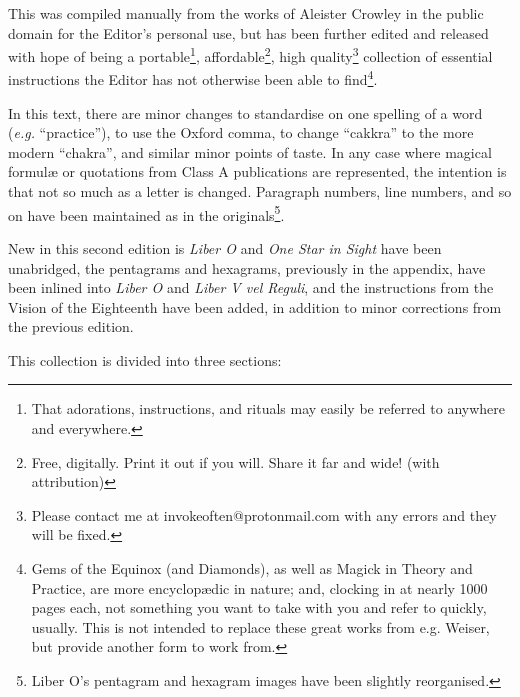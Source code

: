 This was compiled manually from the works of Aleister Crowley in the public domain for the Editor's personal use, but has been further edited and released with hope of being a portable\footnote{That adorations, instructions, and rituals may easily be referred to anywhere and everywhere.}, affordable\footnote{Free\footnotemark, digitally. Print it out if you will. Share it far and wide! (with attribution)}, high quality\footnote{Please contact me at invokeoften@protonmail.com with any errors and they will be fixed.\footnotemark} collection of essential instructions the Editor has not otherwise been able to find\footnote{Gems of the Equinox (and Diamonds), as well as Magick in Theory and Practice, are more encyclop\ae{}dic in nature; and, clocking in at nearly 1000 pages each, not something you want to take with you and refer to quickly, usually. This is not intended to replace these great works from e.g. Weiser, but provide another form to work from.}.

In this text, there are minor changes to standardise on one spelling of a word (\textit{e.g.} \enquote{practice}), to use the Oxford comma, to change \enquote{cakkra} to the more modern \enquote{chakra}, and similar minor points of taste. In any case where magical formul\ae{} or quotations from Class A publications are represented, the intention is that not so much as a letter is changed. Paragraph numbers, line numbers, and so on have been maintained as in the originals\footnote{Liber O's pentagram and hexagram images have been slightly reorganised.}.

New in this second edition is \textit{Liber O} and \textit{One Star in Sight} have been unabridged, the pentagrams and hexagrams, previously in the appendix, have been inlined into \textit{Liber O} and \textit{Liber V vel Reguli}, and the instructions from the Vision of the Eighteenth \AEthyr{} have been added, in addition to minor corrections from the previous edition.

This collection is divided into three sections:


